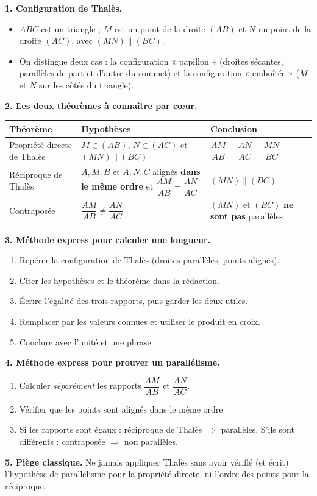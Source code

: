 \documentclass[11pt]{article}
\newcommand{\cle}[1]{{\popxbold\color{popdark}#1}}
\begin{document}
\begin{bilan}
\textbf{1. Configuration de Thalès.}
\begin{itemize}
\item $ABC$ est un triangle ; $M$ est un point de la droite $(AB)$ et $N$ un point de la droite $(AC)$, avec $(MN) \parallel (BC)$.
\item On distingue deux cas : la \cle{configuration « papillon »} (droites sécantes, parallèles de part et d'autre du sommet) et la configuration « emboîtée » ($M$ et $N$ sur les côtés du triangle).
\end{itemize}

\textbf{2. Les deux théorèmes à connaître par cœur.}
\begin{center}
\begin{tabularx}{\linewidth}{|l|X|X|}
\hline
\rowcolor{popblueL} \textbf{Théorème} & \textbf{Hypothèses} & \textbf{Conclusion} \\
\hline
Propriété directe de Thalès & $M \in (AB)$, $N \in (AC)$ et $(MN) \parallel (BC)$ & $\dfrac{AM}{AB} = \dfrac{AN}{AC} = \dfrac{MN}{BC}$ \\
\hline
Réciproque de Thalès & $A, M, B$ et $A, N, C$ alignés \textbf{dans le même ordre} et $\dfrac{AM}{AB} = \dfrac{AN}{AC}$ & $(MN) \parallel (BC)$ \\
\hline
Contraposée & $\dfrac{AM}{AB} \neq \dfrac{AN}{AC}$ & $(MN)$ et $(BC)$ \textbf{ne sont pas} parallèles \\
\hline
\end{tabularx}
\end{center}

\textbf{3. Méthode express pour calculer une longueur.}
\begin{enumerate}
\item Repérer la configuration de Thalès (droites parallèles, points alignés).
\item Citer les hypothèses et le théorème dans la rédaction.
\item Écrire l'égalité des trois rapports, puis garder les deux utiles.
\item Remplacer par les valeurs connues et utiliser le \cle{produit en croix}.
\item Conclure avec l'unité et une phrase.
\end{enumerate}

\textbf{4. Méthode express pour prouver un parallélisme.}
\begin{enumerate}
\item Calculer \emph{séparément} les rapports $\dfrac{AM}{AB}$ et $\dfrac{AN}{AC}$.
\item Vérifier que les points sont alignés dans le même ordre.
\item Si les rapports sont égaux : réciproque de Thalès $\Rightarrow$ parallèles. S'ils sont différents : contraposée $\Rightarrow$ non parallèles.
\end{enumerate}

\textbf{5. Piège classique.} Ne jamais appliquer Thalès sans avoir vérifié (et écrit) l'hypothèse de parallélisme pour la propriété directe, ni l'ordre des points pour la réciproque.
\end{bilan}
\end{document}
